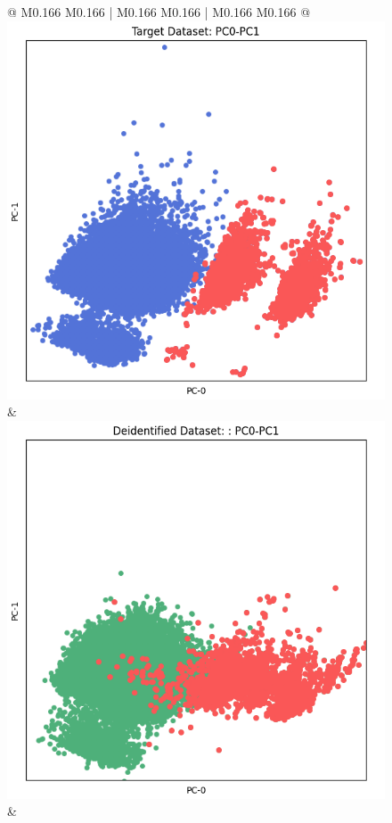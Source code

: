 \begin{figure}[p!]
\begin{tabular}{@{} M{0.166\textwidth} M{0.166\textwidth} | M{0.166\textwidth} M{0.166\textwidth} | M{0.166\textwidth} M{0.166\textwidth} @{}}
       \includegraphics[width=\linewidth]{z_CTGAN.orig.png} &
       \includegraphics[width=\linewidth]{z_CTGAN.syn.png} \\ 
 &

\end{tabular}
\end{figure}
